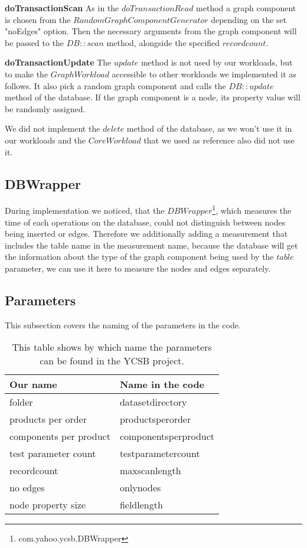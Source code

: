 \textbf{doTransactionScan} \newline
As in the $ doTransactionRead $ method a graph component is chosen from the $ RandomGraphComponentGenerator $ depending on the set "noEdges" option.
Then the necessary arguments from the graph component will be passed to the $ DB::scan $ method,
alongside the specified $ recordcount $.

\textbf{doTransactionUpdate} \newline
The $ update $ method is not used by our workloads,
but to make the $ GraphWorkload $ accessible to other workloads we implemented it as follows.
It also pick a random graph component and calls the $ DB::update $ method of the database.
If the graph component is a node,
its property value will be randomly assigned.

We did not implement the $ delete $ method of the database,
as we won't use it in our workloads and the $ CoreWorkload $ that we used as reference also did not use it.

\subsection{DBWrapper}
During implementation we noticed,
that the $ DBWrapper $\footnote{com.yahoo.ycsb.DBWrapper},
which measures the time of each operations on the database,
could not distinguish between nodes being inserted or edges.
Therefore we additionally adding a measurement that includes the table name in the measurement name,
because the database will get the information about the type of the graph component being used by the $ table $ parameter,
we can use it here to measure the nodes and edges separately.

\subsection{Parameters}
This subsection covers the naming of the parameters in the code.

\begin{table}[h!]
  \begin{minipage}{\textwidth}
    \begin{tabularx}{\textwidth}{ | X | X | }
      \hline
      Our name & Name in the code \\ \hline \hline
      folder & datasetdirectory \\ \hline
      products per order & productsperorder \\ \hline
      components per product & componentsperproduct \\ \hline
      test parameter count & testparametercount \\ \hline
      recordcount & maxscanlength \\ \hline
      no edges & onlynodes \\ \hline
      node property size & fieldlength \\ \hline
    \end{tabularx}
  \end{minipage}
  \caption{This table shows by which name the parameters can be found in the YCSB project.}
  \label{tab:parameterMapping}
\end{table}


